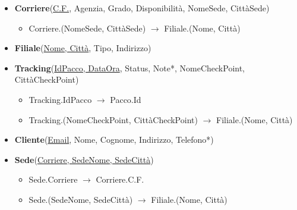 \begin{itemize}
    \item \textbf{Corriere}(\underline{C.F.}, Agenzia, Grado, Disponibilità, NomeSede, CittàSede)
        \begin{itemize}
            \setlength{\itemindent}{+.2in}
            \item Corriere.(NomeSede, CittàSede) $\rightarrow$ Filiale.(Nome, Città)
        \end{itemize}
    \item \textbf{Filiale}(\underline{Nome, Città}, Tipo, Indirizzo)
    \item \textbf{Tracking}(\underline{IdPacco, DataOra}, Status, Note*, NomeCheckPoint,\\CittàCheckPoint)
        \begin{itemize}
                \setlength{\itemindent}{+.2in}
                \item Tracking.IdPacco $\rightarrow$ Pacco.Id
                \item Tracking.(NomeCheckPoint, CittàCheckPoint) $\rightarrow$ Filiale.(Nome, Città)
        \end{itemize}
    \item \textbf{Cliente}(\underline{Email}, Nome, Cognome, Indirizzo, Telefono*)
     \item \textbf{Sede}(\underline{Corriere, SedeNome, SedeCittà})
        \begin{itemize}
            \setlength{\itemindent}{+.2in}
            \item Sede.Corriere $\rightarrow$ Corriere.C.F.
            \item Sede.(SedeNome, SedeCittà) $\rightarrow$ Filiale.(Nome, Città)
        \end{itemize}
     
\end{itemize}
